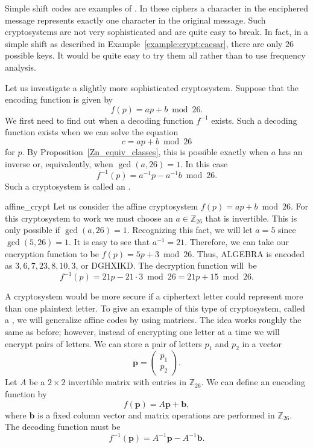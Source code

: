  
Simple shift codes are examples of . In these ciphers a
character in the enciphered message represents exactly one character
in the original message. Such cryptosystems are not very sophisticated
and are quite easy to break. In fact, in a simple shift as described
in Example~\ref{example:crypt:caesar}, there are only 26 possible keys. It would be quite easy
to try them all rather than to use frequency analysis. 
 
 
Let us investigate a slightly more sophisticated cryptosystem. Suppose
that the encoding function is given by  
\[
f(p) = ap + b \bmod 26.
\]
We first need to find out when a decoding function $f^{-1}$ exists.
Such a decoding function exists when we can solve the equation
\[
c = ap + b \bmod 26
\]
for $p$. By Proposition~\ref{Zn_equiv_classes}, this is possible exactly when $a$ has an
inverse or, equivalently, when $\gcd( a, 26) =1$. In this case 
\[
f^{-1}(p) = a^{-1} p - a^{-1} b \bmod 26.
\]
Such a cryptosystem is called an . 
 
 
\begin{example}{affine_crypt}
Let us consider the affine cryptosystem $f(p) = ap + b \bmod 26$. For
this cryptosystem to work we must choose an $a \in {\mathbb Z}_{26}$
that is invertible. This is only possible if $\gcd(a, 26) = 1$.
Recognizing this fact, we will let $a = 5$ since $\gcd(5, 26) = 1$. It
is easy to see that $a^{-1} = 21$. Therefore, we can take our
encryption function to be $f(p) = 5p + 3 \bmod 26$. Thus, ALGEBRA is
encoded as $3, 6, 7, 23, 8, 10, 3$, or DGHXIKD. The decryption
function will~be   
\[
f^{-1}(p) = 21 p - 21 \cdot 3 \bmod 26 = 21 p + 15 \bmod 26.
\]
\end{example} 
 
A cryptosystem would be more secure if a ciphertext letter could
represent more than one plaintext letter.  To give an example of this
type of cryptosystem, called a , we will generalize
affine codes by using matrices. The idea works roughly the same as
before; however, instead of encrypting one letter at a time we will
encrypt pairs of letters.  We can store a pair of letters $p_1$ and
$p_2$ in a vector  
\[
{\mathbf p} = 
\begin{pmatrix}
p_1 \\ p_2
\end{pmatrix}.
\]
Let $A$ be a $2 \times 2$ invertible matrix
with entries in ${\mathbb Z}_{26}$. We can define an encoding function by
\[
f({\mathbf p}) = A {\mathbf p} + {\mathbf b} ,
\]
where ${\mathbf b}$ is a fixed column vector and matrix operations are
performed in ${\mathbb Z}_{26}$. The decoding function must be
\[
f^{-1}({\mathbf p}) = A^{-1} {\mathbf p} - A^{-1} {\mathbf b}.
\]
 
